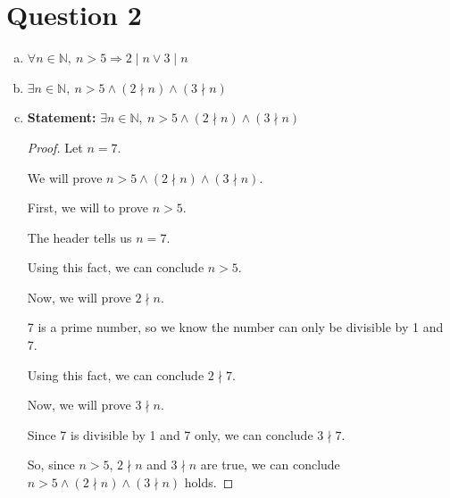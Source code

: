 \documentclass[12pt]{article}
\begin{document}
\section*{Question 2}
\begin{enumerate}[a.]
    \item $\forall n \in \mathbb{N},\:n > 5 \Rightarrow 2 \mid n \lor 3 \mid n$
    \item $\exists n \in \mathbb{N},\: n > 5 \land (2 \nmid n) \land (3 \nmid n)$
    \item

    \textbf{Statement:} $\exists n \in \mathbb{N},\: n > 5 \land (2 \nmid n) \land (3 \nmid n)$

    \begin{proof}
        Let $n = 7$.

        \bigskip

        We will prove $n>5 \land (2 \nmid n) \land (3 \nmid n)$.

        \bigskip

        First, we will to prove $n > 5$.

        \bigskip

        The header tells us $n = 7$.

        \bigskip

        Using this fact, we can conclude $n > 5$.

        \bigskip

        Now, we will prove $2 \nmid n$.

        \bigskip

        7 is a prime number, so we know the number can only be divisible by 1 and 7.

        \bigskip

        Using this fact, we can conclude $2 \nmid 7$.

        \bigskip

        Now, we will prove $3 \nmid n$.

        \bigskip

        Since 7 is divisible by 1 and 7 only, we can conclude $3 \nmid 7$.

        \bigskip

        So, since $n > 5$, $2 \nmid n$ and $3 \nmid n$ are true, we
        can conclude $n>5 \land (2 \nmid n) \land (3 \nmid n)$ holds.
    \end{proof}
\end{enumerate}
\end{document}

